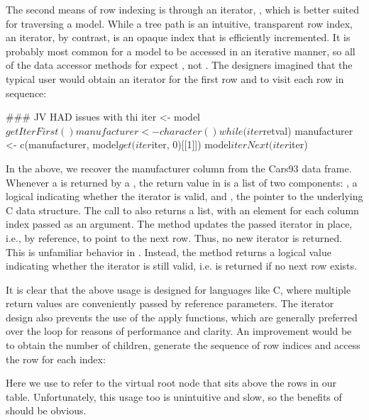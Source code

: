 
The second means of row indexing is through an iterator,
, which is better suited for traversing a model.
While a tree path is an intuitive, transparent row index, an iterator,
by contrast, is an opaque index that is efficiently incremented. It is
probably most common for a model to be accessed in an iterative
manner, so all of the data accessor methods for 
expect , not . The \GTK\/
designers imagined that the typical user would obtain an iterator for
the first row and to visit each row in sequence:
\begin{Schunk}
\begin{Sinput}
 ### JV HAD issues with thi
 iter <- model$getIterFirst()
 manufacturer <- character()
 while(iter$retval) {
   manufacturer <- c(manufacturer, model$get(iter$iter, 0)[[1]])
   model$iterNext(iter$iter)
 }
\end{Sinput}
\end{Schunk}
%
In the above, we recover the manufacturer column from the Cars93 data
frame. Whenever a  is returned by a
, the return value in \R\/ is a list of two
components: , a logical indicating whether the iterator
is valid, and , the pointer to the underlying C data
structure. The call to  also returns a list,
with an element for each column index passed as an argument. The
method  updates the passed iterator in
place, i.e., by reference, to point to the next row. Thus, no new
iterator is returned. This is unfamiliar behavior in \R. Instead, the
method returns a logical value indicating whether the iterator is
still valid, i.e.  is returned if no next row exists.

It is clear that the above usage is designed for languages like C,
where multiple return values are conveniently passed by reference
parameters. The iterator design also prevents the use of the apply
functions, which are generally preferred over the  loop
for reasons of performance and clarity. An improvement would be to
obtain the number of children, generate the sequence of row indices
and access the row for each index:
\begin{Schunk}
\end{Schunk}
%
Here we use  to refer to the virtual root node that sits
above the rows in our table. Unfortunately, this usage too is
unintuitive and slow, so the benefits of  should
be obvious.

